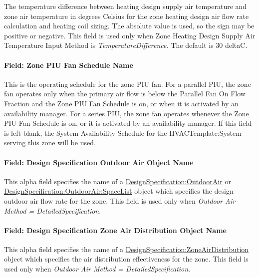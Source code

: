 The temperature difference between heating design supply air temperature and zone air temperature in degrees Celsius for the zone heating design air flow rate calculation and heating coil sizing. The absolute value is used, so the sign may be positive or negative. This field is used only when Zone Heating Design Supply Air Temperature Input Method is \emph{TemperatureDifference.} The default is 30 deltaC.

\paragraph{Field: Zone PIU Fan Schedule Name}\label{field-zone-piu-fan-schedule-name}

This is the operating schedule for the zone PIU fan. For a parallel PIU, the zone fan operates only when the primary air flow is below the Parallel Fan On Flow Fraction and the Zone PIU Fan Schedule is on, or when it is activated by an availability manager. For a series PIU, the zone fan operates whenever the Zone PIU Fan Schedule is on, or it is activated by an availability manager. If this field is left blank, the System Availability Schedule for the HVACTemplate:System serving this zone will be used.

\paragraph{Field: Design Specification Outdoor Air Object Name}\label{field-design-specification-outdoor-air-object-name-8}

This alpha field specifies the name of a \hyperref[designspecificationoutdoorair]{DesignSpecification:OutdoorAir} or \hyperref[designspecificationoutdoorairspacelist]{DesignSpecification:OutdoorAir:SpaceList} object which specifies the design outdoor air flow rate for the zone. This field is used only when \emph{Outdoor Air Method = DetailedSpecification}.

\paragraph{Field: Design Specification Zone Air Distribution Object Name}\label{field-design-specification-zone-air-distribution-object-name-8}

This alpha field specifies the name of a \hyperref[designspecificationzoneairdistribution]{DesignSpecification:ZoneAirDistribution} object which specifies the air distribution effectiveness for the zone. This field is used only when \emph{Outdoor Air Method = DetailedSpecification}.

